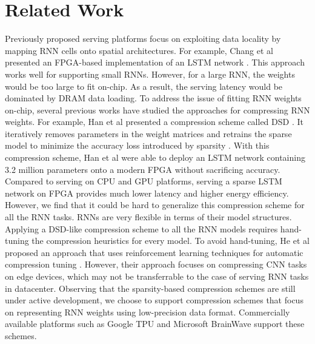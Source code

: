 \section{Related Work}
\label{sec:related}

Previously proposed serving platforms
  focus on exploiting data locality by mapping RNN cells onto spatial architectures.
For example, Chang et al presented an FPGA-based implementation of an LSTM network \cite{chang2015recurrent}.
This approach works well for supporting small RNNs.
However, for a large RNN, the weights would be too large to fit on-chip.
As a result, the serving latency would be dominated by DRAM data loading.
To address the issue of fitting RNN weights on-chip,
  several previous works \cite{han2016dsd, wang2018c, see2016compression, narang2017exploring}
  have studied the approaches for compressing RNN weights.
For example, Han et al presented a compression scheme called DSD \cite{han2016dsd}.
  It iteratively removes parameters in the weight matrices
  and retrains the sparse model
  to minimize the accuracy loss introduced by sparsity \cite{han2016dsd}.
With this compression scheme,
  Han et al were able to deploy an LSTM network
  containing 3.2 million parameters onto a modern FPGA
  without sacrificing accuracy.
Compared to serving on CPU and GPU platforms,
  serving a sparse LSTM network on FPGA provides
  much lower latency and higher energy efficiency.
However, we find that it could be hard to generalize
  this compression scheme for all the RNN tasks.
RNNs are very flexible in terms of their model structures.
Applying a DSD-like compression scheme to all the RNN models
  requires hand-tuning the compression heuristics for every model.
To avoid hand-tuning,
  He et al proposed an approach that uses reinforcement learning
  techniques for automatic compression tuning \cite{he2018amc}.
However, their approach focuses on compressing CNN tasks on edge devices,
  which may not be transferrable to the case of serving RNN tasks in datacenter.
Observing that the sparsity-based compression schemes are still under active development,
  we choose to support compression schemes that focus on representing RNN weights
  using low-precision data format.
Commercially available platforms
  such as Google TPU \cite{jouppi2017datacenter}
  and Microsoft BrainWave \cite{fowers2018configurable}
  support these schemes.

